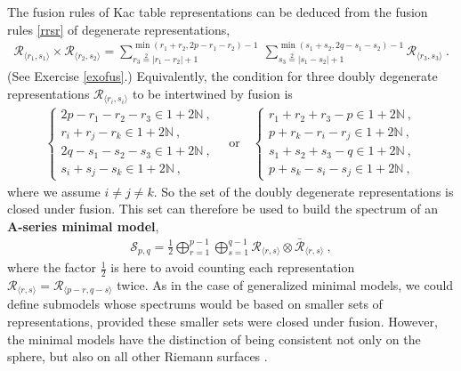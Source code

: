 \documentclass[12pt, a4paper, notitlepage, twoside]{report}
\numberwithin{equation}{section}
\theoremstyle{break}
\begin{document}
The fusion rules of Kac table representations can be deduced from the fusion rules \eqref{rrsr} of degenerate representations, 
\begin{align}
  \boxed{\mathcal{R}_{\langle r_1,s_1 \rangle} \times \mathcal{R}_{\langle r_2,s_2 \rangle} = \sum_{r_3\overset{2}{=}|r_1-r_2|+1}^{\min(r_1+r_2,2p-r_1-r_2)-1}\ \sum_{s_3\overset{2}{=}|s_1-s_2|+1}^{\min(s_1+s_2,2q-s_1-s_2)-1} \mathcal{R}_{\langle r_3,s_3 \rangle}}\ .
\label{rrmm}
\end{align}
(See Exercise \ref{exofus}.) Equivalently, 
the condition for three doubly degenerate representations $\mathcal{R}_{\langle r_i,s_i \rangle}$ to be intertwined by fusion is 
\begin{align}
 \left\{\begin{array}{l}  2p-r_1-r_2-r_3\in 1+2{\mathbb{N}}\ , \\
 r_i+r_j-r_k \in 1 + 2{\mathbb{N}}\ , \\
2q-s_1-s_2-s_3\in 1+2{\mathbb{N}}\ , \\
 s_i+s_j-s_k \in 1 + 2{\mathbb{N}}\ , \end{array}\right.  
\quad \text{or} \quad
 \left\{\begin{array}{l}  r_1+r_2+r_3-p\in 1+2{\mathbb{N}}\ , \\
 p+r_k-r_i-r_j\in 1+2{\mathbb{N}} \ , \\
s_1+s_2+s_3-q\in 1+2{\mathbb{N}}\ , \\
 p+s_k-s_i-s_j\in 1+2{\mathbb{N}} \ ,\end{array}\right. 
 \label{mmfr}
\end{align}
where we assume $i\neq j\neq k$.
So the set of the doubly degenerate representations is closed under fusion.
This set can therefore be used to build the spectrum of an \textbf{A-series minimal model},
\begin{align}
 \boxed{ \mathcal{S}_{p,q} = \frac12 \bigoplus_{r=1}^{p-1} \bigoplus_{s=1}^{q-1} \mathcal{R}_{\langle r,s \rangle}\otimes \bar{\mathcal{R}}_{\langle r,s \rangle} } \ ,
\label{smin}
\end{align}
where the factor $\frac12$ is here to avoid counting each representation $\mathcal{R}_{\langle r,s \rangle}=\mathcal{R}_{\langle p-r,q-s \rangle}$ twice.
As in the case of generalized minimal models, we could define submodels whose spectrums would be based on smaller sets of representations, provided these smaller sets were closed under fusion.
However, the minimal models have the distinction of being consistent not only on the sphere, but also on all other Riemann surfaces \cite{fms97}.
\end{document}
